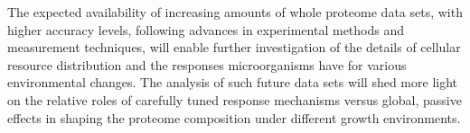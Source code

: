 The expected availability of increasing amounts of whole proteome data sets, with higher accuracy levels, following advances in experimental methods and measurement techniques, will enable further investigation of the details of cellular resource distribution and the responses microorganisms have for various environmental changes.
The analysis of such future data sets will shed more light on the relative roles of carefully tuned response mechanisms versus global, passive effects in shaping the proteome composition under different growth environments.